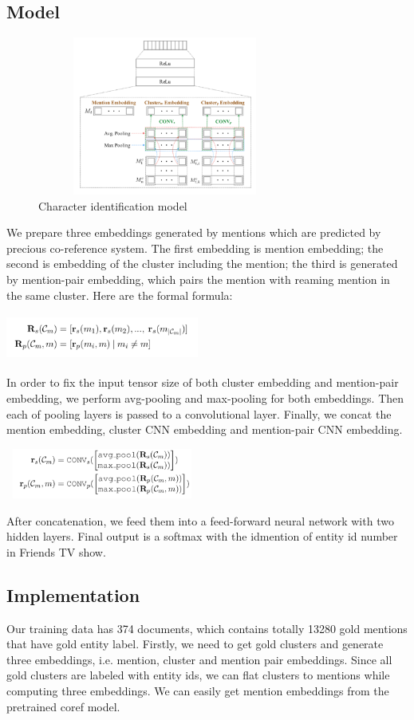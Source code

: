\documentclass[11pt]{article}
\begin{document}
\subsection{Model}
\begin{figure}[h]                
 \includegraphics[width=3.3in,height=2.05in]{05.jpg}
 \caption{Character identification model}             
\end{figure}

We prepare three embeddings generated by mentions which are predicted by precious co-reference system. The first embedding is mention embedding; the second is embedding of the cluster including the mention; the third is generated by mention-pair embedding, which pairs the mention with reaming mention in the same cluster. Here are the formal formula:

\includegraphics[width=2.50in,height=0.60in]{06.jpg}

In order to fix the input tensor size of both cluster embedding and mention-pair embedding, we perform avg-pooling and max-pooling for both embeddings. Then each of pooling layers is passed to a convolutional layer. Finally, we concat the mention embedding, cluster CNN embedding and mention-pair CNN embedding.

\includegraphics[width=2.50in,height=0.65in]{07.jpg}

After concatenation, we feed them into a feed-forward neural network with two hidden layers. Final output is a softmax with the idmention of entity id number in Friends TV show.

\subsection{Implementation}
Our training data has 374 documents, which contains totally 13280 gold mentions that have gold entity label. Firstly, we need to get gold clusters and generate three embeddings, i.e. mention, cluster and mention pair embeddings. Since all gold clusters are labeled with entity ids, we can flat clusters to mentions while computing three embeddings. We can easily get mention embeddings from the pretrained coref model.
\end{document}
